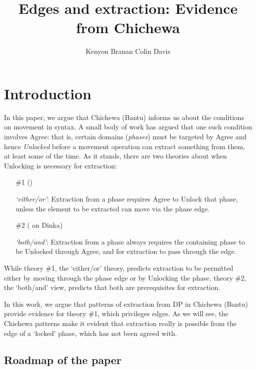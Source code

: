 \documentclass[output=paper,colorlinks,citecolor=brown]{langscibook}
\title{Edges and extraction: Evidence from Chichewa}
\author{%
 Kenyon Branan\affiliation{MIT}\lastand
 Colin Davis\affiliation{MIT}
}
\begin{document}
\maketitle 

\section{Introduction}\label{sec:branan:1}

In this paper, we argue that Chichewa (Bantu) informs us about the conditions on movement in syntax. A small body of work has argued that one such condition involves Agree: that is, certain domains (\textit{phases}) must be targeted by Agree and hence \textit{Unlocked} before a movement operation can extract something from them, at least some of the time. As it stands, there are two theories about when Unlocking is necessary for extraction:

\begin{itemize}
	\item[\#1] (\citealt{RackowskiRichards2005, Halpert2016, Halpert2019, Branan2018})

    \textit{`either/or'}: Extraction from a phase requires Agree to Unlock that phase, unless the element to be extracted can move via the phase edge.

    \item[\#2] (\citealt{VanUrkRichards2015} on Dinka)

    \textit{`both/and'}: Extraction from a phase always requires the containing phase to be Unlocked through Agree, and for extraction to pass through the edge.
\end{itemize}

While theory \#1, the `either/or' theory, predicts extraction to be permitted either by moving through the phase edge or by Unlocking the phase, theory \#2, the `both/and' view, predicts that both are prerequisites for extraction.

In this work, we argue that patterns of extraction from DP in Chichewa (Bantu) provide evidence for theory \#1, which privileges edges. As we will see, the Chichewa patterns make it evident that extraction really is possible from the edge of a `locked' phase, which has not been agreed with.

\subsection{Roadmap of the paper}\label{sec:branan:1.1}
\end{document}
